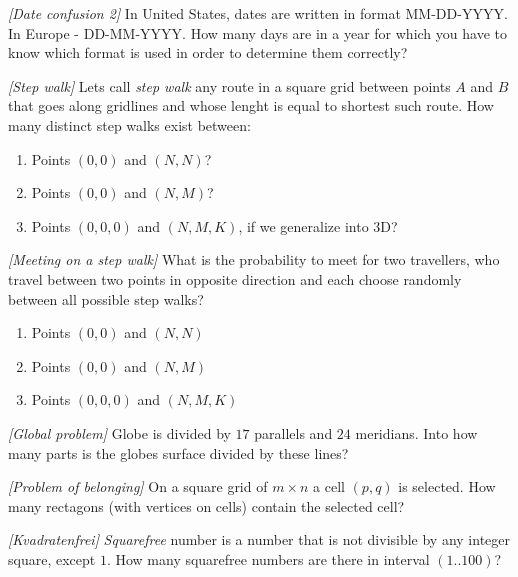 %
\filbreak
\begin{problem}
\textit{[Date confusion 2]}
In United States, dates are written in format MM-DD-YYYY. In Europe - DD-MM-YYYY. How many days are in a year for which you have to know which format is used in order to determine them correctly?
\end{problem}
\filbreak
\begin{problem}
\textit{[Step walk]}
Lets call \textit{step walk} any route in a square grid between points $A$ and $B$ that goes along gridlines and whose lenght is equal to shortest such route. How many distinct step walks exist between:
\begin{enumerate}
\item Points $(0,0)$ and $(N,N)$?
\item Points $(0,0)$ and $(N,M)$?
\item Points $(0,0,0)$ and $(N,M,K)$, if we generalize into 3D?
\end{enumerate}
\end{problem}
\filbreak
\begin{problem}
\textit{[Meeting on a step walk]}
What is the probability to meet for two travellers, who travel between two points in opposite direction and each choose randomly between all possible step walks?
\begin{enumerate}
\item Points $(0,0)$ and $(N,N)$
\item Points $(0,0)$ and $(N,M)$
\item Points $(0,0,0)$ and $(N,M,K)$
\end{enumerate}
\end{problem}
\filbreak
\begin{problem}
\textit{[Global problem]}
Globe is divided by $17$ parallels and $24$ meridians. Into how many parts is the globes surface divided by these lines? 
\end{problem}
%
\filbreak
\begin{problem}
\textit{[Problem of belonging]}
On a square grid of $m \times n$ a cell $(p,q)$ is selected. How many rectagons (with vertices on cells) contain the selected cell?
\end{problem}
%
\filbreak
\begin{problem}
\textit{[Kvadratenfrei]}
\textit{Squarefree} number is a number that is not divisible by any integer square, except $1$. How many squarefree numbers are there in interval $(1..100)$?
\end{problem}
%

